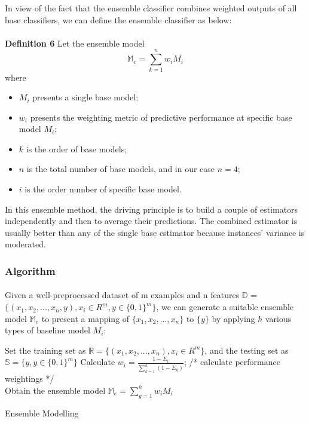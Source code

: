\documentclass[runningheads]{llncs}
\begin{document}
In view of the fact that the ensemble classifier combines weighted outputs of all base classifiers, we can define the ensemble classifier as below: \\
\\
\textbf{Definition 6} Let the ensemble model \\
\begin{equation}\label{reio}
	\mathbb{M}_{e} = \sum_{k = 1}^{n} w_{i} M_{i} 
\end{equation}
where
\begin{itemize}
  \item $M_{i}$ presents a single base model;
  \item $w_{i}$ presents the weighting metric of predictive performance at specific base model $M_{i}$;
  \item $k$ is the order of base models;
  \item $n$ is the total number of base models, and in our case $n = 4$;
  \item $i$ is the order number of specific base model.
\end{itemize}
%
In this ensemble method, the driving principle is to build a couple of estimators independently and then to average their predictions. The combined estimator is usually better than any of the single base estimator because instances' variance is moderated.
%
\subsubsection{Algorithm}
%
\paragraph{}
Given a well-preprocessed dataset of m examples and n features $\mathbb{D}$ = $\displaystyle \big\{ (x_{1}, x_{2}, ... , x_{n}, y ), x_{i} \in R^{m}, y \in {\{0, 1\}}^{m}  \big\}$, we can generate a suitable ensemble model $\mathbb{M}_{e} $ to present a mapping of $\big\{ x_{1}, x_{2}, ... , x_{n} \big\}$ to $\big\{ y \big\}$ by applying $h$ various types of baseline model $M_{i}$:\\
\IncMargin{1em}
\begin{algorithm}[H]
\BlankLine
Set the training set as $\mathbb{R} = \big\{ (x_{1}, x_{2}, ... , x_{n} ), x_{i} \in R^{m} \big\}$, and the testing set as $\mathbb{S} = \big\{  y, y \in {\{0, 1\}}^{m}  \big\}$\;
Calculate $w_{i} = \frac{1 - E_{i} }{\sum_{k = 1}^{h} (1 - E_{k}) }$; /* calculate performance weightings */\\
Obtain the ensemble model $\mathbb{M}_{e} = \sum_{g = 1}^{h} w_{i} M_{i} $\;
\caption{Ensemble Modelling}\label{ensemble}
\end{algorithm}\DecMargin{1em}
%
%
%
%
%
%
%
%
\end{document}
